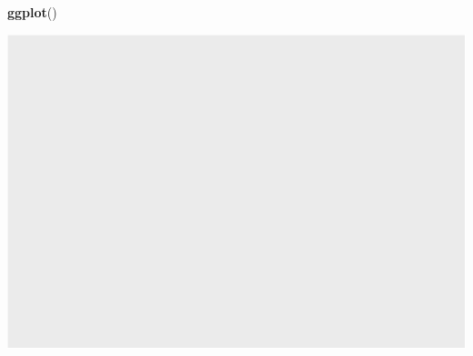 \documentclass[]{article}
\newenvironment{Shaded}{\begin{snugshade}}{\end{snugshade}}
\newcommand{\KeywordTok}[1]{\textcolor[rgb]{0.13,0.29,0.53}{\textbf{#1}}}
\newcommand{\NormalTok}[1]{#1}
\begin{document}
\begin{Shaded}
\begin{Highlighting}[]
\KeywordTok{ggplot}\NormalTok{()}
\end{Highlighting}
\end{Shaded}

\includegraphics{EcoliTechnicalReport_files/figure-latex/unnamed-chunk-2-1.pdf}
\end{document}
